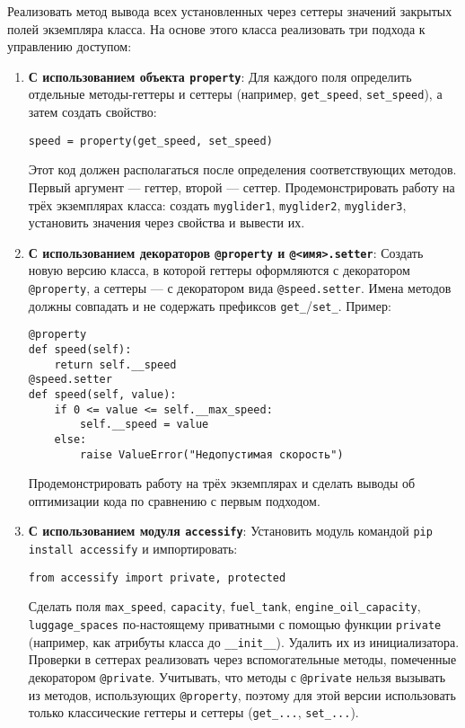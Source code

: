 \begin{enumerate}
\begin{itemize}
\end{itemize}
Реализовать метод вывода всех установленных через сеттеры значений закрытых полей экземпляра класса.
На основе этого класса реализовать три подхода к управлению доступом:
\begin{enumerate}
    \item \textbf{С использованием объекта \texttt{property}}:  
    Для каждого поля определить отдельные методы-геттеры и сеттеры (например, \texttt{get\_speed}, \texttt{set\_speed}), а затем создать свойство:  
    \begin{verbatim}
speed = property(get_speed, set_speed)
    \end{verbatim}  
    Этот код должен располагаться после определения соответствующих методов. Первый аргумент — геттер, второй — сеттер.  
    Продемонстрировать работу на трёх экземплярах класса: создать \texttt{myglider1}, \texttt{myglider2}, \texttt{myglider3}, установить значения через свойства и вывести их.
    \item \textbf{С использованием декораторов \texttt{@property} и \texttt{@<имя>.setter}}:  
    Создать новую версию класса, в которой геттеры оформляются с декоратором \texttt{@property}, а сеттеры — с декоратором вида \texttt{@speed.setter}. Имена методов должны совпадать и не содержать префиксов \texttt{get\_}/\texttt{set\_}.  
    Пример:  
    \begin{verbatim}
@property
def speed(self):
    return self.__speed
@speed.setter
def speed(self, value):
    if 0 <= value <= self.__max_speed:
        self.__speed = value
    else:
        raise ValueError("Недопустимая скорость")
    \end{verbatim}  
    Продемонстрировать работу на трёх экземплярах и сделать выводы об оптимизации кода по сравнению с первым подходом.
    \item \textbf{С использованием модуля \texttt{accessify}}:  
    Установить модуль командой \texttt{pip install accessify} и импортировать:  
    \begin{verbatim}
from accessify import private, protected
    \end{verbatim}  
    Сделать поля \texttt{max\_speed}, \texttt{capacity}, \texttt{fuel\_tank}, \texttt{engine\_oil\_capacity}, \texttt{luggage\_spaces} по-настоящему приватными с помощью функции \texttt{private} (например, как атрибуты класса до \texttt{\_\_init\_\_}). Удалить их из инициализатора.  
    Проверки в сеттерах реализовать через вспомогательные методы, помеченные декоратором \texttt{@private}.  
    Учитывать, что методы с \texttt{@private} нельзя вызывать из методов, использующих \texttt{@property}, поэтому для этой версии использовать только классические геттеры и сеттеры (\texttt{get\_...}, \texttt{set\_...}).  

\end{enumerate}
\end{enumerate}

